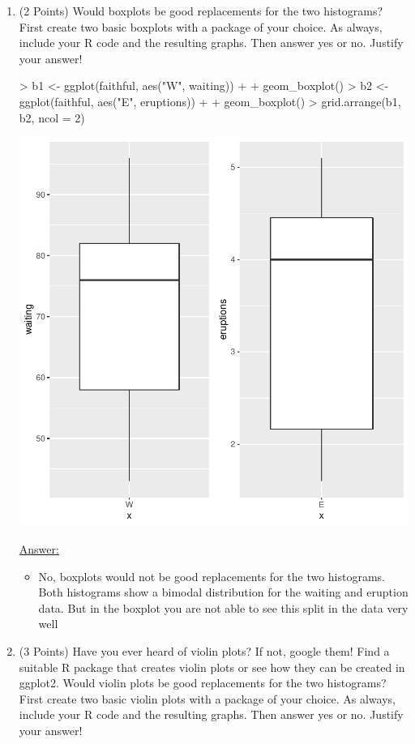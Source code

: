 \documentclass[12pt,letterpaper,final]{article}
\begin{document}
\begin{enumerate}
\begin{enumerate}
\item (2 Points) Would boxplots be good replacements for the two histograms? 
First create two basic boxplots with a package of your choice.
As always, include your R code and the resulting graphs.
Then answer yes or no. Justify your answer!

\begin{Schunk}
\begin{Sinput}
> b1 <- ggplot(faithful, aes("W", waiting)) +
+   geom_boxplot()
> b2 <- ggplot(faithful, aes("E", eruptions)) +
+   geom_boxplot()
> grid.arrange(b1, b2, ncol = 2)
\end{Sinput}
\end{Schunk}
\includegraphics{rnw_example-014}

\underline{Answer:}
\begin{itemize}
\item No, boxplots would not be good replacements for the two histograms. Both histograms show a bimodal distribution for the waiting and eruption data. But in the boxplot you are not able to see this split in the data very well
\end{itemize}





\item (3 Points) Have you ever heard of violin plots? If not, google them!
Find a suitable R package that creates violin plots or see how they can be
created in ggplot2.
Would violin plots be good replacements for the two histograms? 
First create two basic violin plots with a package of your choice.
As always, include your R code and the resulting graphs.
Then answer yes or no. Justify your answer!


\end{enumerate}
\end{enumerate}
\end{document}
